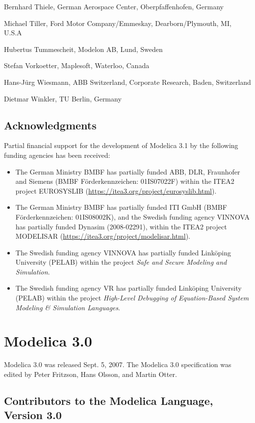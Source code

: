 Bernhard Thiele, German Aerospace Center, Oberpfaffenhofen, Germany

Michael Tiller, Ford Motor Company/Emmeskay, Dearborn/Plymouth, MI,
U.S.A

Hubertus Tummescheit, Modelon AB, Lund, Sweden

Stefan Vorkoetter, Maplesoft, Waterloo, Canada

Hans-Jürg Wiesmann, ABB Switzerland, Corporate Research, Baden,
Switzerland

Dietmar Winkler, TU Berlin, Germany

\subsection{Acknowledgments}\label{acknowledgments3}

Partial financial support for the development of Modelica 3.1 by the
following funding agencies has been received:
\begin{itemize}
\item
  The German Ministry BMBF has partially funded ABB, DLR, Fraunhofer and
  Siemens (BMBF Förderkennzeichen: 01IS07022F) within the ITEA2 project
  EUROSYSLIB (\url{https://itea3.org/project/eurosyslib.html}).
\item
  The German Ministry BMBF has partially funded ITI GmbH (BMBF
  Förderkennzeichen: 01IS08002K), and the Swedish funding agency VINNOVA
  has partially funded Dynasim (2008-02291), within the ITEA2 project
  MODELISAR (\url{https://itea3.org/project/modelisar.html}).
\item
  The Swedish funding agency VINNOVA has partially funded Linköping
  University (PELAB) within the project \emph{Safe and Secure Modeling and
  Simulation}.
\item
  The Swedish funding agency VR has partially funded Linköping
  University (PELAB) within the project \emph{High-Level Debugging of
  Equation-Based System Modeling \& Simulation Languages}.
\end{itemize}

\section{Modelica 3.0}\label{modelica-3-0}

Modelica 3.0 was released Sept. 5, 2007. The Modelica 3.0 specification
was edited by Peter Fritzson, Hans Olsson, and Martin Otter.

\subsection{Contributors to the Modelica Language, Version 3.0}\label{contributors-to-the-modelica-language-version-3-0}

